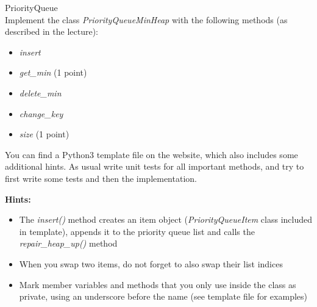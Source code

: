  PriorityQueue \\
Implement the class \textit{PriorityQueueMinHeap} with the following methods
(as described in the lecture):
\begin{itemize}
  \item\textit{insert} 
  \item\textit{get\_min} (1 point)
  \item\textit{delete\_min} 
  \item\textit{change\_key} 
  \item\textit{size} (1 point)
\end{itemize}

You can find a Python3 template file on the website, which also includes some additional hints. 
As usual write unit tests for all important methods, and try to first write some tests 
and then the implementation.

\textbf{Hints:}
\begin{itemize}
\item The \emph{insert()} method creates an item object (\emph{PriorityQueueItem} class included in template), appends it to the priority queue list and calls the \emph{repair\_heap\_up()} method
\item When you swap two items, do not forget to also swap their list indices
\item Mark member variables and methods that you only use inside the class as private, using an underscore before the name (see template file for examples)
\end{itemize}
